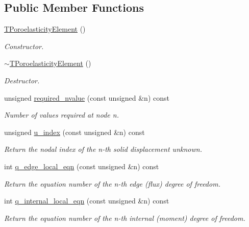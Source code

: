 \subsection*{Public Member Functions}
\begin{DoxyCompactItemize}
\item 
\hyperlink{classoomph_1_1TPoroelasticityElement_a12d7d5e9fe2723d0644d0a49e73b594b}{T\+Poroelasticity\+Element} ()
\begin{DoxyCompactList}\small\item\em Constructor. \end{DoxyCompactList}\item 
\hyperlink{classoomph_1_1TPoroelasticityElement_aaebbe25a0e6ca23d4c0dc9658013adbc}{$\sim$\+T\+Poroelasticity\+Element} ()
\begin{DoxyCompactList}\small\item\em Destructor. \end{DoxyCompactList}\item 
unsigned \hyperlink{classoomph_1_1TPoroelasticityElement_a03e370454fbf25ba5d57c0e9e5d95062}{required\+\_\+nvalue} (const unsigned \&n) const
\begin{DoxyCompactList}\small\item\em Number of values required at node n. \end{DoxyCompactList}\item 
unsigned \hyperlink{classoomph_1_1TPoroelasticityElement_a23b1b0c75019070b07760815745cd742}{u\+\_\+index} (const unsigned \&n) const
\begin{DoxyCompactList}\small\item\em Return the nodal index of the n-\/th solid displacement unknown. \end{DoxyCompactList}\item 
int \hyperlink{classoomph_1_1TPoroelasticityElement_a662897b1eae45958e2ac4fe2cb5b63bf}{q\+\_\+edge\+\_\+local\+\_\+eqn} (const unsigned \&n) const
\begin{DoxyCompactList}\small\item\em Return the equation number of the n-\/th edge (flux) degree of freedom. \end{DoxyCompactList}\item 
int \hyperlink{classoomph_1_1TPoroelasticityElement_a6e45ef2eff3ba7ba401a1502760c7724}{q\+\_\+internal\+\_\+local\+\_\+eqn} (const unsigned \&n) const
\begin{DoxyCompactList}\small\item\em Return the equation number of the n-\/th internal (moment) degree of freedom. \end{DoxyCompactList}\item 

\end{DoxyCompactItemize}

